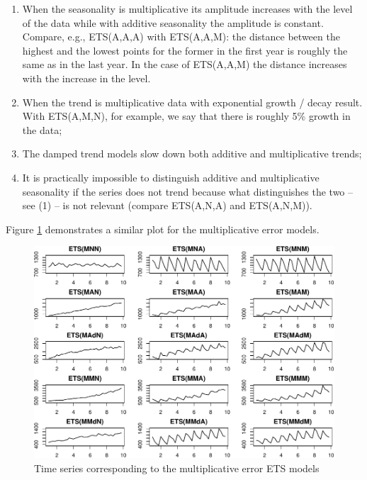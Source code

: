 \documentclass[
]{book}
\providecommand{\tightlist}{%
  \setlength{\itemsep}{0pt}\setlength{\parskip}{0pt}}
\theoremstyle{definition}
\theoremstyle{definition}
\theoremstyle{definition}
\theoremstyle{definition}
\theoremstyle{remark}
\begin{document}
\begin{enumerate}
\def\labelenumi{\arabic{enumi}.}
\tightlist
\item
  When the seasonality is multiplicative its amplitude increases with the level of the data while with additive seasonality the amplitude is constant. Compare, e.g., ETS(A,A,A) with ETS(A,A,M): the distance between the highest and the lowest points for the former in the first year is roughly the same as in the last year. In the case of ETS(A,A,M) the distance increases with the increase in the level.
\item
  When the trend is multiplicative data with exponential growth / decay result. With ETS(A,M,N), for example, we say that there is roughly 5\% growth in the data;
\item
  The damped trend models slow down both additive and multiplicative trends;
\item
  It is practically impossible to distinguish additive and multiplicative seasonality if the series does not trend because what distinguishes the two -- see (1) -- is not relevant (compare ETS(A,N,A) and ETS(A,N,M)).
\end{enumerate}

Figure \ref{fig:ETSTaxonomyMultiplicative} demonstrates a similar plot for the multiplicative error models.

\begin{figure}
\centering
\includegraphics{adam_files/figure-latex/ETSTaxonomyMultiplicative-1.pdf}
\caption{\label{fig:ETSTaxonomyMultiplicative}Time series corresponding to the multiplicative error ETS models}
\end{figure}
\end{document}
